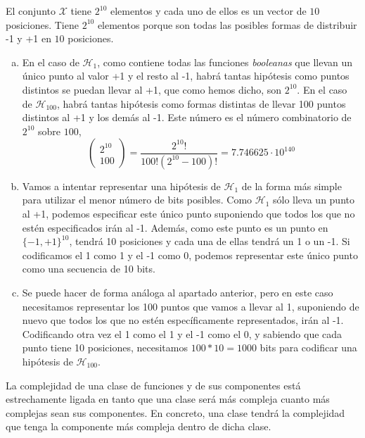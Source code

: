 \documentclass[12pt]{article}
\theoremstyle{definition}
\begin{document}
\begin{pregunta}
El conjunto $\mathcal{X}$ tiene $2^{10}$ elementos y cada uno de ellos es un vector de $10$ posiciones. Tiene $2^{10}$ elementos porque son todas las posibles formas de distribuir -1 y +1 en $10$ posiciones.
\begin{enumerate}[a)]
\item En el caso de $\mathcal{H}_1$, como contiene todas las funciones \textit{booleanas} que llevan un único punto al valor +1 y el resto al -1, habrá tantas hipótesis como puntos distintos se puedan llevar al +1, que como hemos dicho, son $2^{10}$. En el caso de $\mathcal{H}_{100}$, habrá tantas hipótesis como formas distintas de llevar 100 puntos distintos al +1 y los demás al -1. Este número es el número combinatorio de $2^{10}$ sobre $100$,
\[ \left( \begin{array}{c} 2^{10} \\ 
			100 \end{array} \right) = \frac{2^{10}!}{100! (2^{10}-100)!} = 7.746625\cdot10^{140} \]
\item Vamos a intentar representar una hipótesis de $\mathcal{H}_1$ de la forma más simple para utilizar el menor número de bits posibles. Como $\mathcal{H}_1$ sólo lleva un punto al +1, podemos especificar este único punto suponiendo que todos los que no estén especificados irán al -1. Además, como este punto es un punto en $ \{-1, +1\}^{10}$, tendrá 10 posiciones y cada una de ellas tendrá un 1 o un -1. Si codificamos el 1 como 1 y el -1 como 0, podemos representar este único punto como una secuencia de 10 bits.
\item Se puede hacer de forma análoga al apartado anterior, pero en este caso necesitamos representar los 100 puntos que vamos a llevar al 1, suponiendo de nuevo que todos los que no estén específicamente representados, irán al -1. Codificando otra vez el 1 como el 1 y el -1 como el 0, y sabiendo que cada punto tiene 10 posiciones, necesitamos $100*10=1000$ bits para codificar una hipótesis de $\mathcal{H}_{100}$.
\end{enumerate}

La complejidad de una clase de funciones y de sus componentes está estrechamente ligada en tanto que una clase será más compleja cuanto más complejas sean sus componentes. En concreto, una clase tendrá la complejidad que tenga la componente más compleja dentro de dicha clase.

\end{pregunta}
\end{document}
